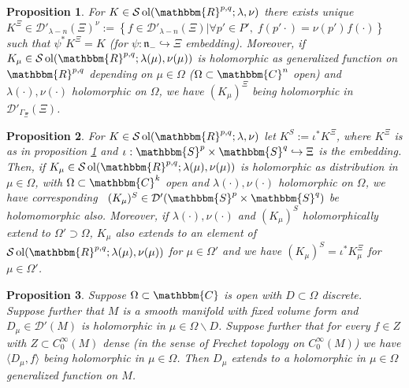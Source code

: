 \documentclass{article}
\newcommand{\assign}{:=}
\newcommand{\comma}{{,}}
\newcommand{\tmop}[1]{\ensuremath{\operatorname{#1}}}
\numberwithin{definition}{section}
\numberwithin{lemma}{section}
\newtheorem{proposition}{Proposition}
\numberwithin{proposition}{section}
{\theorembodyfont{\rmfamily}\newtheorem{remark}{Remark}
\numberwithin{remark}{section}
}
\begin{document}
\begin{proposition}
  \label{k-finite:prop-claim2}For $K \in \mathcal{S} \tmop{ol} (
  \mathbbm{R}^{p, q} ; \lambda, \nu)$ there exists unique $K^{\Xi} \in
  \mathcal{D}'_{\lambda - n} ( \Xi)^{\nu} \assign \left\{ f \in
  \mathcal{D}'_{\lambda - n} ( \Xi) | \forall p' \in P', \; f ( p' \cdot) =
  \nu ( p')^{} f ( \cdot) \right\}$ such that $\psi^{\ast} K^{\Xi} = K$ (for
  $\psi : \mathfrak{n}_- \hookrightarrow \Xi$ embedding). Moreover, if
  $K_{\mu} \in \mathcal{S} \tmop{ol} ( \mathbbm{R}^{p, q} ; \lambda ( \mu),
  \nu ( \mu))$ is holomorphic as generalized function on $\mathbbm{R}^{p, q}$
  depending on $\mu \in \Omega$ ($\Omega \subset \mathbbm{C}^n$ open) and
  $\lambda ( \cdot), \nu ( \cdot)$ holomorphic on $\Omega$, we have $(
  K_{\mu})^{\Xi}$ being holomorphic in $\mathcal{D}'_{\Gamma_{\Xi}} ( \Xi)$. 
\end{proposition}

\begin{proposition}
  \label{k-finite:prop-holo-to-holo}For $K \in \mathcal{S} \tmop{ol} (
  \mathbbm{R}^{p, q} ; \lambda, \nu)$ let $K^S \assign \iota^{\ast} K^{\Xi}$,
  where $K^{\Xi}$ is as in proposition \ref{k-finite:prop-claim2} and $\iota :
  \mathbbm{S}^p \times \mathbbm{S}^q \hookrightarrow \Xi$ is the embedding.
  Then, if $K_{\mu} \in \mathcal{S} \tmop{ol} ( \mathbbm{R}^{p, q} ; \lambda (
  \mu), \nu ( \mu))$ is holomorphic as distribution in $\mu \in \Omega$, with
  $\Omega \subset \mathbbm{C}^k$ open and $\lambda ( \cdot) \comma \nu (
  \cdot)$ holomorphic on $\Omega$, we have corresponding \ $( K_{\mu})^S \in
  \mathcal{D}' ( \mathbbm{S}^p \times \mathbbm{S}^q)$ be holomomorphic also.
  Moreover, if $\lambda ( \cdot), \nu ( \cdot)$ and $( K_{\mu})^S$
  holomorphically extend to $\Omega' \supset \Omega$, $K_{\mu}$ also extends
  to an element of $\mathcal{S} \tmop{ol} ( \mathbbm{R}^{p, q} ; \lambda (
  \mu), \nu ( \mu))$ for $\mu \in \Omega'$ and we have $( K_{\mu})^S =
  \iota^{\ast} K_{\mu}^{\Xi}$ for $\mu \in \Omega'$.
\end{proposition}

\begin{proposition}
  \label{k-finite:prop-kfinite-extension-oneparam}Suppose $\Omega \subset
  \mathbbm{C}$ is open with $D \subset \Omega$ discrete. Suppose further that
  $M$ is a smooth manifold with fixed volume form and $D_{\mu} \in
  \mathcal{D}' ( M)$ is holomorphic in $\mu \in \Omega \backslash D$. Suppose
  further that for every $f \in Z$ with $Z \subset C^{\infty}_0 ( M)$ dense
  (in the sense of Frechet topology on $C_0^{\infty} ( M)$) we have $\langle
  D_{\mu}, f \rangle$ being holomorphic in $\mu \in \Omega$. Then $D_{\mu}$
  extends to a holomorphic in $\mu \in \Omega$ generalized function on $M$. 
\end{proposition}
\end{document}
